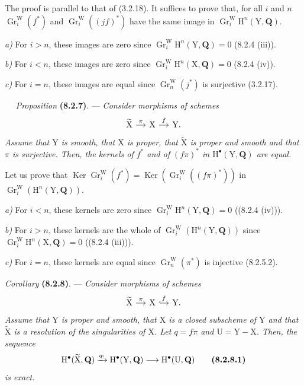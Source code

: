 \documentclass[11pt,leqno]{article}
\newcommand{\Page}[1]{\ifvmode\noindent\else\unskip\ \fi{\footnotesize\textcolor{gray}{[p.\,#1]}}\ \ignorespaces}
\begin{document}
The proof is parallel to that of (3.2.18). It suffices to prove that, for all \(i\) and \(n\) \(\operatorname{Gr}_i^{\mathrm{W}}(f^*)\) and \(\operatorname{Gr}_i^{\mathrm{W}}((jf)^*)\) have the same image in \(\operatorname{Gr}_i^{\mathrm{W}}\mathrm{H}^n(\mathrm{Y},\mathbf{Q})\).

\textit{a)} For \(i>n\), these images are zero since \(\operatorname{Gr}_i^{\mathrm{W}}\mathrm{H}^n(\mathrm{Y},\mathbf{Q})=0\) (8.2.4 (iii)).

\textit{b)} For \(i<n\), these images are zero since \(\operatorname{Gr}_i^{\mathrm{W}}\mathrm{H}^n(\mathrm{X},\mathbf{Q})=0\) (8.2.4 (iv)).

\textit{c)} For \(i=n\), these images are equal since \(\operatorname{Gr}_n^{\mathrm{W}}(j^*)\) is surjective (3.2.17).

\Page{40}
\textit{Proposition} \textbf{(8.2.7)}. — \textit{Consider morphisms of schemes}
\[
\begin{tikzcd}[column sep=small]
\widetilde{\mathrm{X}} \arrow[r,"\pi"]
 & \mathrm{X} \arrow[r,"f"]
 & \mathrm{Y}.
\end{tikzcd}
\]
\textit{Assume that \(\mathrm{Y}\) is smooth, that \(\mathrm{X}\) is proper, that \(\widetilde{\mathrm{X}}\) is proper and smooth and that \(\pi\) is surjective. Then, the kernels of \(f^*\) and of \((f\pi)^*\) in \(\mathrm{H}^\bullet(\mathrm{Y},\mathbf{Q})\) are equal.}

Let us prove that \(\operatorname{Ker}\operatorname{Gr}_i^{\mathrm{W}}(f^*)=\operatorname{Ker}(\operatorname{Gr}_i^{\mathrm{W}}((f\pi)^*))\) in \(\operatorname{Gr}_i^{\mathrm{W}}(\mathrm{H}^n(\mathrm{Y},\mathbf{Q}))\).

\textit{a)} For \(i<n\), these kernels are zero since \(\operatorname{Gr}_i^{\mathrm{W}}\mathrm{H}^n(\mathrm{Y},\mathbf{Q})=0\) ((8.2.4 (iv))).

\textit{b)} For \(i>n\), these kernels are the whole of \(\operatorname{Gr}_i^{\mathrm{W}}(\mathrm{H}^n(\mathrm{Y},\mathbf{Q}))\) since \(\operatorname{Gr}_i^{\mathrm{W}}\mathrm{H}^n(\mathrm{X},\mathbf{Q})=0\) ((8.2.4 (iii))).

\textit{c)} For \(i=n\), these kernels are equal since \(\operatorname{Gr}_n^{\mathrm{W}}(\pi^*)\) is injective (8.2.5.2).

\textit{Corollary} \textbf{(8.2.8)}. — \textit{Consider morphisms of schemes}
\[
\begin{tikzcd}[column sep=small]
\widetilde{\mathrm{X}} \arrow[r,"\pi"]
 & \mathrm{X} \arrow[r,hook,"f"]
 & \mathrm{Y}.
\end{tikzcd}
\]
\textit{Assume that \(\mathrm{Y}\) is proper and smooth, that \(\mathrm{X}\) is a closed subscheme of \(\mathrm{Y}\) and that \(\widetilde{\mathrm{X}}\) is a resolution of the singularities of \(\mathrm{X}\). Let \(q=f\pi\) and \(\mathrm{U}=\mathrm{Y}-\mathrm{X}\). Then, the sequence}
\[
\mathrm{H}^\bullet(\widetilde{\mathrm{X}},\mathbf{Q})
\xrightarrow{q_!}\mathrm{H}^\bullet(\mathrm{Y},\mathbf{Q})
\longrightarrow\mathrm{H}^\bullet(\mathrm{U},\mathbf{Q})
\tag*{\textbf{(8.2.8.1)}}
\]
\textit{is exact.}
\end{document}
